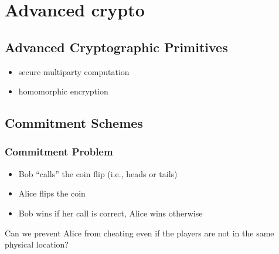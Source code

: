 \documentclass[final]{article}
\begin{document}

\section{Advanced crypto}
\subsection{Advanced Cryptographic Primitives}
\begin{itemize}[nosep]
    \item secure multiparty computation
    \item homomorphic encryption
\end{itemize}
\subsection{Commitment Schemes}
\subsubsection*{Commitment Problem}
\begin{itemize}[nosep]
    \item Bob “calls” the coin flip (i.e., heads or tails)
    \item Alice flips the coin
    \item Bob wins if her call is correct, Alice wins otherwise
\end{itemize}
Can we prevent Alice from cheating even if the players are not in the same physical location?
\end{document}

